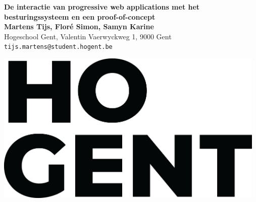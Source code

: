\documentclass[a0,portrait]{a0poster}
\begin{document}
\begin{minipage}[t]{0.75\linewidth}
\VeryHuge \color{HoGentAccent1} \textbf{De interactie van progressive web applications met het besturingssysteem en een proof-of-concept} \color{Black}\\ %
\huge \textbf{Martens Tijs, Floré Simon, Samyn Karine}\\[0.5cm] %
\huge Hogeschool Gent, Valentin Vaerwyckweg 1, 9000 Gent\\[0.4cm] %
\Large \texttt{tijs.martens@student.hogent.be} \\
\end{minipage}
%
\begin{minipage}[t]{0.25\linewidth}
\includegraphics[width=13cm,right]{figures/HOGENT_Logo_Pos_rgb.png} 

\end{minipage}

\vspace{1cm}

\end{document}
